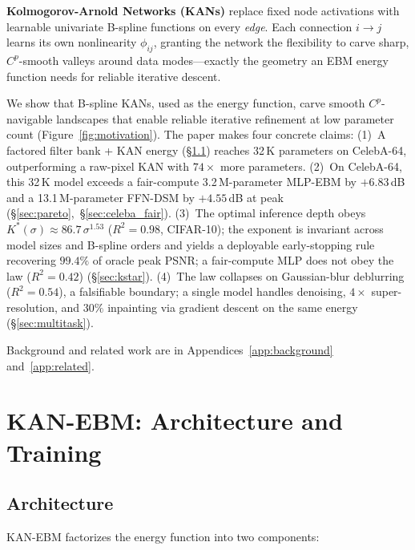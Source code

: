 \documentclass{article}
\begin{document}
\textbf{Kolmogorov-Arnold Networks (KANs)} \citep{liu2024kan} replace fixed node
activations with learnable univariate B-spline functions on every \emph{edge}.
Each connection $i \!\to\! j$ learns its own nonlinearity $\phi_{ij}$, granting the
network the flexibility to carve sharp, $C^p$-smooth valleys around data modes---exactly
the geometry an EBM energy function needs for reliable iterative descent.

We show that B-spline KANs, used as the energy function, carve smooth $C^p$-navigable
landscapes that enable reliable iterative refinement at low parameter count (Figure~\ref{fig:motivation}).
The paper makes four concrete claims:
(1)~A factored filter bank + KAN energy (\S\ref{sec:arch}) reaches 32\,K parameters
on CelebA-64, outperforming a raw-pixel KAN with $74\times$ more parameters.
(2)~On CelebA-64, this 32\,K model exceeds a fair-compute 3.2\,M-parameter MLP-EBM
by $+6.83$\,dB and a 13.1\,M-parameter FFN-DSM by $+4.55$\,dB at peak
(\S\ref{sec:pareto},~\S\ref{sec:celeba_fair}).
(3)~The optimal inference depth obeys $K^{*}(\sigma)\approx 86.7\,\sigma^{1.53}$
($R^{2}{=}0.98$, CIFAR-10); the exponent is invariant across model sizes and
B-spline orders and yields a deployable early-stopping rule recovering $99.4\%$ of
oracle peak PSNR; a fair-compute MLP does not obey the law ($R^{2}{=}0.42$)
(\S\ref{sec:kstar}).
(4)~The law collapses on Gaussian-blur deblurring ($R^{2}{=}0.54$), a falsifiable
boundary; a single model handles denoising, $4\times$ super-resolution, and $30\%$
inpainting via gradient descent on the same energy (\S\ref{sec:multitask}).

Background and related work are in Appendices~\ref{app:background} and~\ref{app:related}.

\section{KAN-EBM: Architecture and Training}

\subsection{Architecture}
\label{sec:arch}

KAN-EBM factorizes the energy function into two components:
\end{document}
